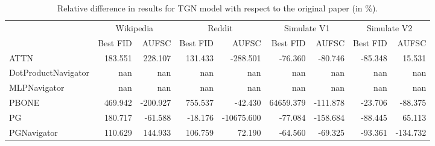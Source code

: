 \begin{table}
\centering
\begin{tabular}{lrrrrrrrr}
\toprule
 & \multicolumn{2}{c}{Wikipedia} & \multicolumn{2}{c}{Reddit} & \multicolumn{2}{c}{Simulate V1} & \multicolumn{2}{c}{Simulate V2} \\
 & Best FID & AUFSC & Best FID & AUFSC & Best FID & AUFSC & Best FID & AUFSC \\
\midrule
ATTN & 183.551 & 228.107 & 131.433 & -288.501 & -76.360 & -80.746 & -85.348 & 15.531 \\
DotProductNavigator & nan & nan & nan & nan & nan & nan & nan & nan \\
MLPNavigator & nan & nan & nan & nan & nan & nan & nan & nan \\
PBONE & 469.942 & -200.927 & 755.537 & -42.430 & 64659.379 & -111.878 & -23.706 & -88.375 \\
PG & 180.717 & -61.588 & -18.176 & -10675.600 & -77.084 & -158.684 & -88.445 & 65.113 \\
PGNavigator & 110.629 & 144.933 & 106.759 & 72.190 & -64.560 & -69.325 & -93.361 & -134.732 \\
\bottomrule
\end{tabular}
\caption{\label{tab:tgn_results_diff}Relative difference in results for TGN model with respect to the original paper (in \%).}
\end{table}
